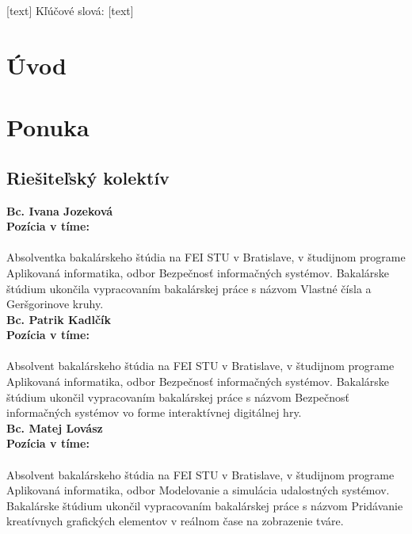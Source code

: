 \documentclass[a4paper,12pt]{article}
\begin{document}
[text]
\newline \newline
Kľúčové slová: [text]
\newpage

\renewcommand{\contentsname}{Obsah}
\tableofcontents
\newpage
\renewcommand{\listfigurename}{Zoznam obrázkov}
\listoffigures
\newpage


\section*{Úvod}
\setcounter{page}{1}
\pagestyle{plain}
\newpage

\section{Ponuka}
\subsection{Riešiteľský kolektív}
\textbf{Bc. Ivana Jozeková} \\
\textbf{Pozícia v tíme: } \\ \\
Absolventka bakalárskeho štúdia na FEI STU v Bratislave, v študijnom programe Aplikovaná informatika, odbor Bezpečnosť informačných systémov. Bakalárske štúdium ukončila vypracovaním bakalárskej práce s názvom Vlastné čísla a Geršgorinove kruhy. \\ 

\noindent \textbf{Bc. Patrik Kadlčík} \\
\textbf{Pozícia v tíme: } \\ \\
Absolvent bakalárskeho štúdia na FEI STU v Bratislave, v študijnom programe Aplikovaná informatika, odbor Bezpečnosť informačných systémov. Bakalárske štúdium ukončil vypracovaním bakalárskej práce s názvom Bezpečnosť informačných systémov vo forme interaktívnej digitálnej hry. \\ 

\noindent \textbf{Bc. Matej Lovász} \\
\textbf{Pozícia v tíme: } \\ \\
Absolvent bakalárskeho štúdia na FEI STU v Bratislave, v študijnom programe Aplikovaná informatika, odbor Modelovanie a simulácia udalostných systémov. Bakalárske štúdium ukončil vypracovaním bakalárskej práce s názvom Pridávanie kreatívnych grafických elementov v reálnom čase na zobrazenie tváre. \\ 
\end{document}
